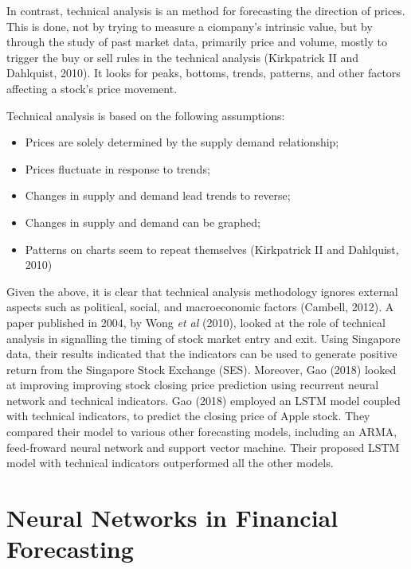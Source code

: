 In contrast, technical analysis is an method for forecasting the direction of prices. This is done, not by trying to measure a ciompany's intrinsic value, but by through the study of past market data, primarily price and volume, mostly to trigger the buy or sell rules in the technical analysis (Kirkpatrick II and Dahlquist, 2010). It looks for peaks, bottoms, trends, patterns, and other factors affecting a stock's price movement.

Technical analysis is based on the following assumptions:
\begin{itemize}
\item Prices are solely determined by the supply demand relationship;
\item Prices fluctuate in response to trends;
\item Changes in supply and demand lead trends to reverse;
\item Changes in supply and demand can be graphed;
\item Patterns on charts seem to repeat themselves (Kirkpatrick II and Dahlquist, 2010)
\end{itemize}

Given the above, it is clear that technical analysis methodology ignores external aspects such as political, social, and macroeconomic factors (Cambell, 2012). A paper published in 2004, by Wong \textit{et al} (2010), looked at the role of technical analysis in signalling the timing of stock market entry and exit. Using Singapore data, their results indicated that the indicators can be used to generate positive return from the Singapore Stock Exchange (SES). Moreover, Gao (2018) looked at improving improving stock closing price prediction using recurrent neural network and technical indicators. Gao (2018) employed an LSTM model coupled with technical indicators, to predict the closing price of Apple stock. They compared their model to various other forecasting models, including an ARMA, feed-froward neural network and support vector machine. Their proposed LSTM model with technical indicators outperformed all the other models. 

\section{Neural Networks in Financial Forecasting}

